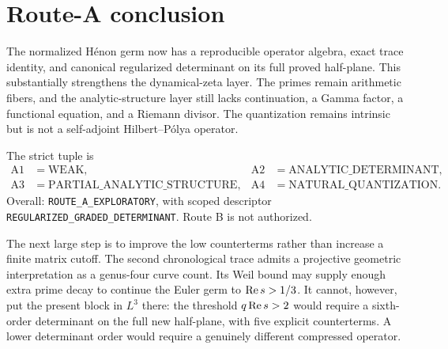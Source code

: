 \section{Route-A conclusion}

The normalized H\'enon germ now has a reproducible operator algebra, exact
trace identity, and canonical regularized determinant on its full proved
half-plane.  This substantially strengthens the dynamical-zeta layer.  The
primes remain arithmetic fibers, and the analytic-structure layer still lacks
continuation, a Gamma factor, a functional equation, and a Riemann divisor.
The quantization remains intrinsic but is not a self-adjoint Hilbert--P\'olya
operator.

The strict tuple is
\begin{align*}
 \mathrm{A1}&=\mathrm{WEAK},
 &\mathrm{A2}&=\mathrm{ANALYTIC\_DETERMINANT},\\
 \mathrm{A3}&=\mathrm{PARTIAL\_ANALYTIC\_STRUCTURE},
 &\mathrm{A4}&=\mathrm{NATURAL\_QUANTIZATION}.
\end{align*}
Overall: \texttt{ROUTE\_A\_EXPLORATORY}, with scoped descriptor
\texttt{REGULARIZED\_GRADED\_DETERMINANT}.  Route B is not authorized.

The next large step is to improve the low counterterms rather than increase a
finite matrix cutoff.  The second chronological trace admits a projective
geometric interpretation as a genus-four curve count.  Its Weil bound may
supply enough extra prime decay to continue the Euler germ to
$\operatorname{Re} s>1/3$.  It cannot, however, put the present block in $L^3$ there:
the threshold $q\operatorname{Re} s>2$ would require a sixth-order determinant on the
full new half-plane, with five explicit counterterms.  A lower determinant
order would require a genuinely different compressed operator.
